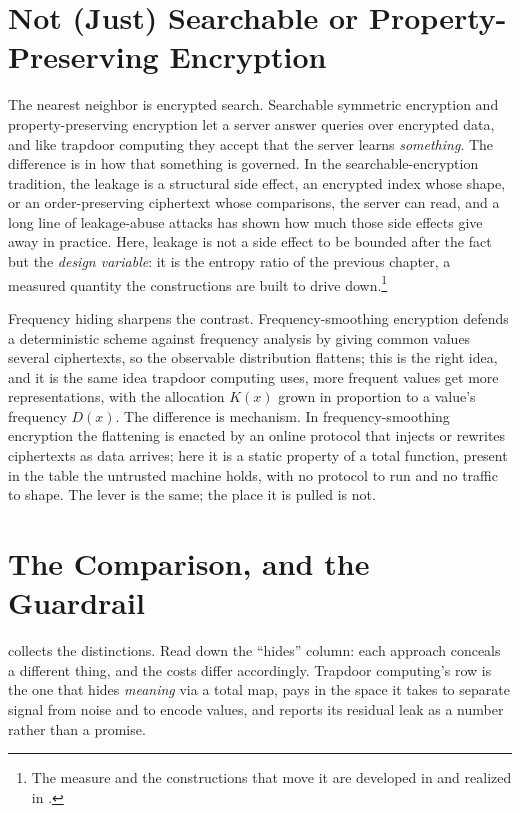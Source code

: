 \section{Not (Just) Searchable or Property-Preserving Encryption}
\label{sec:not-sse}

The nearest neighbor is encrypted search. Searchable symmetric encryption
and property-preserving encryption let a server answer queries over
encrypted data, and like trapdoor computing they accept that the server
learns \emph{something}. The difference is in how that something is
governed. In the searchable-encryption tradition, the leakage is a
structural side effect, an encrypted index whose shape, or an
order-preserving ciphertext whose comparisons, the server can read, and a
long line of leakage-abuse attacks has shown how much those side effects
give away in practice. Here, leakage is not a side effect to be bounded
after the fact but the \emph{design variable}: it is the entropy ratio of
the previous chapter, a measured quantity the constructions are built to
drive down.\footnote{The measure and the constructions that move it are
developed in  and realized in
.}

Frequency hiding sharpens the contrast. Frequency-smoothing encryption
defends a deterministic scheme against frequency analysis by giving common
values several ciphertexts, so the observable distribution flattens; this
is the right idea, and it is the same idea trapdoor computing uses, more
frequent values get more representations, with the allocation $K(x)$ grown
in proportion to a value's frequency $D(x)$. The difference is mechanism.
In frequency-smoothing encryption the flattening is enacted by an online
protocol that injects or rewrites ciphertexts as data arrives; here it is a
static property of a total function, present in the table the untrusted
machine holds, with no protocol to run and no traffic to shape. The lever
is the same; the place it is pulled is not.

\section{The Comparison, and the Guardrail}
\label{sec:comparison-guardrail}

 collects the distinctions. Read down the ``hides'' column:
each approach conceals a different thing, and the costs differ accordingly.
Trapdoor computing's row is the one that hides \emph{meaning} via a total
map, pays in the space it takes to separate signal from noise and to encode
values, and reports its residual leak as a number rather than a promise.

